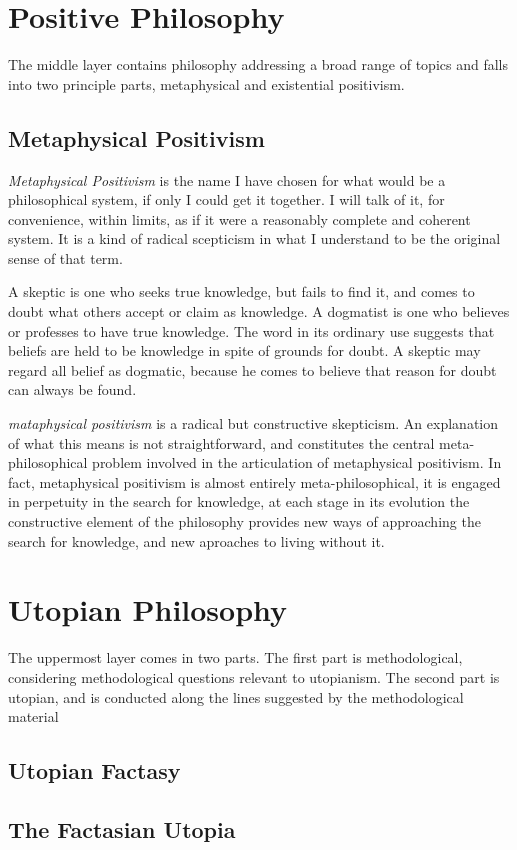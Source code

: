 \documentclass{rbjk}
\begin{document}
\begin{article}
\section{Positive Philosophy}

The middle layer contains philosophy addressing a broad range of topics and falls into two principle parts, metaphysical and existential positivism.

\subsection{Metaphysical Positivism}

{\it Metaphysical Positivism} is the name I have chosen for what would be a philosophical system, if only I could get it together.
I will talk of it, for convenience, within limits, as if it were a reasonably complete and coherent system.
It is a kind of radical scepticism in what I understand to be the original sense of that term.

A skeptic is one who seeks true knowledge, but fails to find it, and comes to doubt what others accept or claim as knowledge.
A dogmatist is one who believes or professes to have true knowledge.
The word in its ordinary use suggests that beliefs are held to be knowledge in spite of grounds for doubt.
A skeptic may regard all belief as dogmatic, because he comes to believe that reason for doubt can always be found.

{\it mataphysical positivism} is a radical but constructive skepticism.
An explanation of what this means is not straightforward, and constitutes the central meta-philosophical problem involved in the articulation of metaphysical positivism.
In fact, metaphysical positivism is almost entirely meta-philosophical, it is engaged in perpetuity in the search for knowledge, at each stage in its evolution the constructive element of the philosophy provides new ways of approaching the search for knowledge, and new aproaches to living without it.

\section{Utopian Philosophy}

The uppermost layer comes in two parts.
The first part is methodological, considering methodological questions relevant to utopianism.
The second part is utopian, and is conducted along the lines suggested by the methodological material

\subsection{Utopian Factasy}

\subsection{The Factasian Utopia}



%
%

\end{article}
\end{document}
